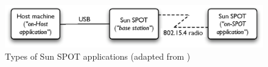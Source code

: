   
\begin{figure}
\centering
\label{Fig:SunSPOTS_applications}
\includegraphics[scale=0.71]{img/SunSPOTS_applications.eps} \caption[Types of Sun SPOT applications]{Types of Sun SPOT applications (adapted from
\cite{sun_developer:2008})}
\end{figure}   
  